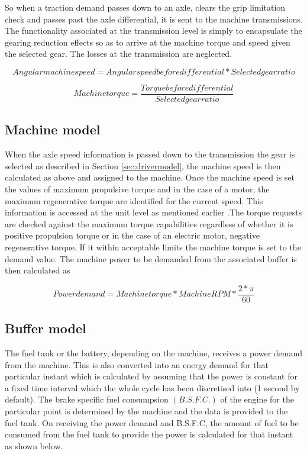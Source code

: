 \documentclass[ExampleMasters.tex]{subfiles}
\begin{document}
 So when a traction demand passes down to an axle, clears the grip limitation check and passes past the axle differential, it is sent to the machine transmissions. The functionality associated at the transmission level is simply to encapsulate the gearing reduction effects so as to arrive at the machine torque and speed given the selected gear. The losses at the transmission are neglected. 

\begin{equation} \label{eq:transpeedgearing}
Angular machine speed =Angular speed before differential*Selected gear ratio
\end{equation}

\begin{equation} \label{eq:transtorquegearing}
Machine torque =\frac{Torque before differential}{Selected gear ratio}
\end{equation}

\subsection{Machine model}
\label{sec:machinemodel}

When the axle speed information is passed down to the transmission the gear is selected as described in Section \ref{sec:drivermodel}, the machine speed is then calculated as above and assigned to the machine. Once the machine speed is set the values of maximum propulsive torque and in the case of a motor, the maximum regenerative torque are identified for the current speed. This information is accessed at the unit level as mentioned earlier .The torque requests are checked against the maximum torque capabilities regardless of whether it is positive propulsion torque or in the case of an electric motor, negative regenerative torque. If it within acceptable limits the machine torque is set to the demand value. The machine power to be demanded from the associated buffer is then calculated as 

\begin{equation} \label{eq:machinepowerdem}
Power demand=Machine torque*MachineRPM*\frac{2*\pi}{60}
\end{equation}

\subsection{Buffer model}
\label{sec:machinemodel}

The fuel tank or the battery, depending on the machine, receives a power demand from the machine. This is also converted into an energy demand for that particular instant which is calculated by assuming that the power is constant for a fixed time interval which the whole cycle has been discretised into (1 second by default). The brake specific fuel consumpsion $(B.S.F.C.)$ of the engine for the particular point is determined by the machine and the data is provided to the fuel tank.  On receiving the power demand and B.S.F.C, the amount of fuel to be consumed from the fuel tank to provide the power is calculated for that instant as shown below.
\end{document}
